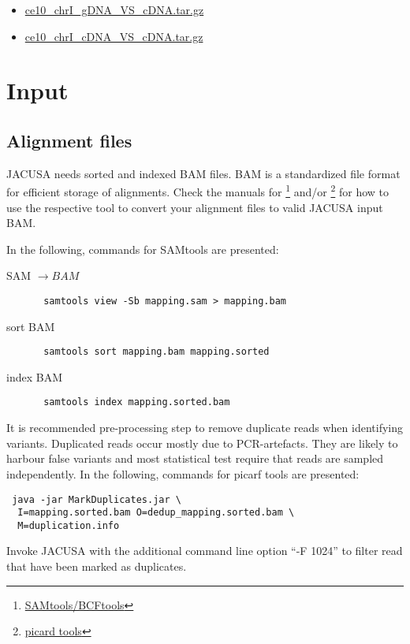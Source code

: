\documentclass[10pt, a4paper]{article}
\begin{document}
\begin{itemize}
  \item 
  \href{http://www.age.mpg.com/software/jacusa/sample_data/ce10_chrI_gDNA_VS_cDNA.tar.gz}{ce10\_chrI\_gDNA\_VS\_cDNA.tar.gz}
  \item 
  \href{http://www.age.mpg.com/software/jacusa/sample_data/ce10_chrI_cDNA_VS_cDNA.tar.gz}{ce10\_chrI\_cDNA\_VS\_cDNA.tar.gz}
\end{itemize}
\section{Input}
\subsection{Alignment files}
JACUSA needs sorted and indexed BAM files. BAM is a standardized file format for
efficient storage of alignments. Check the manuals for
\footnote{\href{http://samtools.sourceforge.net/}{SAMtools/BCFtools}} and/or
\footnote{\href{http://broadinstitute.github.io/picard/}{picard tools}} for how to use the
respective tool to convert your alignment files to valid JACUSA input BAM.

In the following, commands for SAMtools are presented:
\begin{description}
\item[SAM $\rightarrow BAM$] \begin{verbatim} samtools view -Sb mapping.sam > mapping.bam \end{verbatim}
\item[sort BAM] \begin{verbatim} samtools sort mapping.bam mapping.sorted \end{verbatim} 
\item[index BAM] \begin{verbatim} samtools index mapping.sorted.bam \end{verbatim}
\end{description}

It is recommended pre-processing step to remove duplicate reads when identifying variants.
Duplicated reads occur mostly due to PCR-artefacts. 
They are likely to harbour false variants and most statistical test require that reads are sampled independently.  
In the following, commands for picarf tools are presented:
\begin{verbatim} java -jar MarkDuplicates.jar \ 
  I=mapping.sorted.bam O=dedup_mapping.sorted.bam \ 
  M=duplication.info
\end{verbatim}
Invoke JACUSA with the additional command line option ``-F 1024'' to filter read that have been marked as duplicates.
\end{document}
